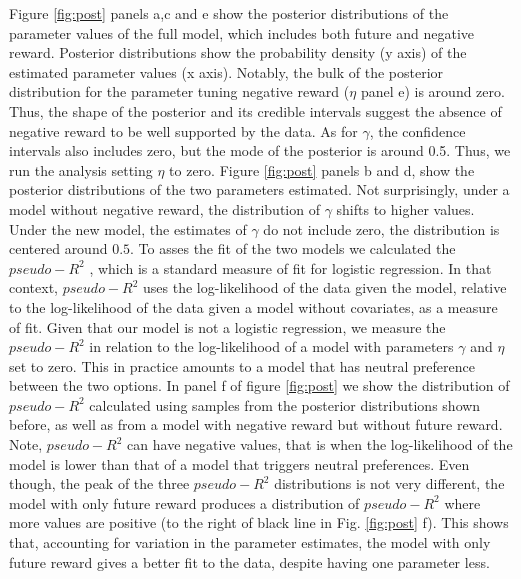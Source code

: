 \documentclass[]{rsos}%
\begin{document}
Figure \ref{fig:post} panels a,c and e show the posterior distributions
of the parameter values of the full model, which includes both future
and negative reward. Posterior distributions show the probability
density (y axis) of the estimated parameter values (x axis). Notably,
the bulk of the posterior distribution for the parameter tuning negative
reward (\(\eta\) panel e) is around zero. Thus, the shape of the posterior
and its credible intervals suggest the absence of negative reward to be
well supported by the data. As for \(\gamma\), the confidence intervals
also includes zero, but the mode of the posterior is around 0.5. Thus,
we run the analysis setting \(\eta\) to zero. Figure \ref{fig:post} panels
b and d, show the posterior distributions of the two parameters
estimated. Not surprisingly, under a model without negative reward, the
distribution of \(\gamma\) shifts to higher values. Under the new model,
the estimates of \(\gamma\) do not include zero, the distribution is
centered around \(0.5\). To asses the fit of the two models we calculated
the \(pseudo-R^2\) \citep{mcfadden_Conditional_1974}, which is a standard
measure of fit for logistic regression. In that context, \(pseudo-R^2\)
uses the log-likelihood of the data given the model, relative to the
log-likelihood of the data given a model without covariates, as a
measure of fit. Given that our model is not a logistic regression, we
measure the \(pseudo-R^2\) in relation to the log-likelihood of a model
with parameters \(\gamma\) and \(\eta\) set to zero. This in practice
amounts to a model that has neutral preference between the two options.
In panel f of figure \ref{fig:post} we show the distribution of
\(pseudo-R^2\) calculated using samples from the posterior distributions
shown before, as well as from a model with negative reward but without
future reward. Note, \(pseudo-R^2\) can have negative values, that is when
the log-likelihood of the model is lower than that of a model that
triggers neutral preferences. Even though, the peak of the three
\(pseudo-R^2\) distributions is not very different, the model with only
future reward produces a distribution of \(pseudo-R^2\) where more values
are positive (to the right of black line in Fig. \ref{fig:post} f). This
shows that, accounting for variation in the parameter estimates, the
model with only future reward gives a better fit to the data, despite
having one parameter less.
\end{document}

